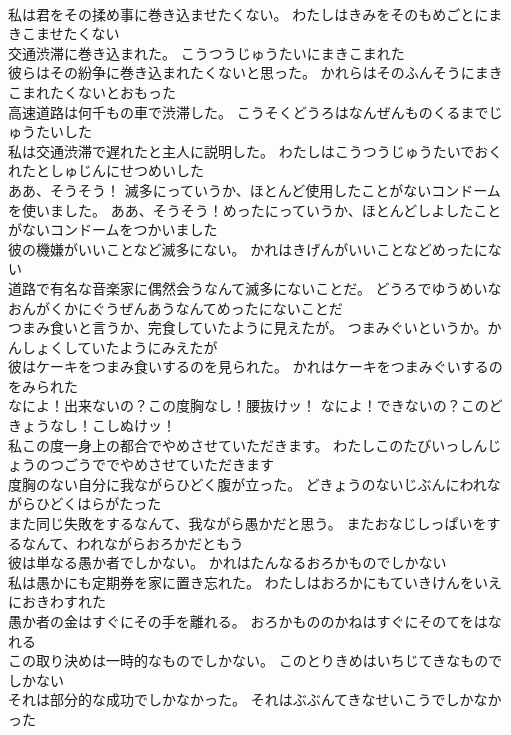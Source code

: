 \documentclass[8pt]{extreport}
\begin{document}
\begin{CJK}{UTF8}{min}
\\	私は君をその揉め事に巻き込ませたくない。	わたしはきみをそのもめごとにまきこませたくない 
\\	交通渋滞に巻き込まれた。	こうつうじゅうたいにまきこまれた 
\\	彼らはその紛争に巻き込まれたくないと思った。	かれらはそのふんそうにまきこまれたくないとおもった 
\\	高速道路は何千もの車で渋滞した。	こうそくどうろはなんぜんものくるまでじゅうたいした 
\\	私は交通渋滞で遅れたと主人に説明した。	わたしはこうつうじゅうたいでおくれたとしゅじんにせつめいした 
\\	ああ、そうそう！ 滅多にっていうか、ほとんど使用したことがないコンドームを使いました。	ああ、そうそう！めったにっていうか、ほとんどしよしたことがないコンドームをつかいました 
\\	彼の機嫌がいいことなど滅多にない。	かれはきげんがいいことなどめったにない 
\\	道路で有名な音楽家に偶然会うなんて滅多にないことだ。	どうろでゆうめいなおんがくかにぐうぜんあうなんてめったにないことだ 
\\	つまみ食いと言うか、完食していたように見えたが。	つまみぐいというか。かんしょくしていたようにみえたが 
\\	彼はケーキをつまみ食いするのを見られた。	かれはケーキをつまみぐいするのをみられた 
\\	なによ！出来ないの？この度胸なし！腰抜けッ！	なによ！できないの？このどきょうなし！こしぬけッ！ 
\\	私この度一身上の都合でやめさせていただきます。	わたしこのたびいっしんじょうのつごうででやめさせていただきます 
\\	度胸のない自分に我ながらひどく腹が立った。	どきょうのないじぶんにわれながらひどくはらがたった 
\\	また同じ失敗をするなんて、我ながら愚かだと思う。	またおなじしっぱいをするなんて、われながらおろかだともう 
\\	彼は単なる愚か者でしかない。	かれはたんなるおろかものでしかない 
\\	私は愚かにも定期券を家に置き忘れた。	わたしはおろかにもていきけんをいえにおきわすれた 
\\	愚か者の金はすぐにその手を離れる。	おろかもののかねはすぐにそのてをはなれる 
\\	この取り決めは一時的なものでしかない。	このとりきめはいちじてきなものでしかない 
\\	それは部分的な成功でしかなかった。	それはぶぶんてきなせいこうでしかなかった 

\end{CJK}
\end{document}
